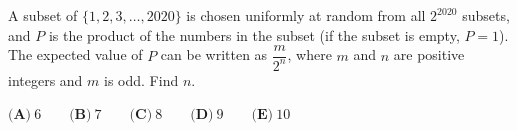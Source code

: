 A subset of $\{1,2,3,\dots,2020\}$ is chosen uniformly at random from all $2^{2020}$ subsets, and $P$ is the product of the numbers in the subset (if the subset is empty, $P=1$). The expected value of $P$ can be written as $\dfrac{m}{2^n}$, where $m$ and $n$ are positive integers and $m$ is odd. Find $n$.

$\textbf{(A)}\ 6 \qquad\textbf{(B)}\ 7 \qquad\textbf{(C)}\ 8 \qquad\textbf{(D)}\ 9 \qquad\textbf{(E)}\ 10$
